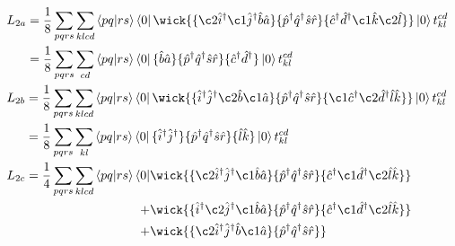 \begin{align}
    &\begin{aligned}
        L_{2a}
        &= \frac{1}{8}\sum_{pqrs} \sum_{klcd} \bra{pq} \ket{rs} \bra{0}
            \wick{
            \{\c2{\hat{i}}^\dagger \c1{\hat{j}}^\dagger \hat{b} \hat{a} \}
            \{\hat{p}^\dagger \hat{q}^\dagger \hat{s} \hat{r} \}
            \{\hat{c}^\dagger \hat{d}^\dagger \c1{\hat{k}} \c2{\hat{l}} \}
            }
            \ket{0}t^{cd}_{kl} \\
        &= \frac{1}{8}\sum_{pqrs} \sum_{cd} \bra{pq} \ket{rs} \bra{0}
            \{ \hat{b} \hat{a} \}
            \{\hat{p}^\dagger \hat{q}^\dagger \hat{s} \hat{r} \}
            \{ \hat{c}^\dagger \hat{d}^\dagger \}
            \ket{0}t^{cd}_{kl}
    \end{aligned} \\
    &\begin{aligned}
        L_{2b}
        &= \frac{1}{8}\sum_{pqrs} \sum_{klcd} \bra{pq} \ket{rs} \bra{0}
            \wick{
            \{\hat{i}^\dagger \hat{j}^\dagger \c2{\hat{b}} \c1{\hat{a}} \}
            \{\hat{p}^\dagger \hat{q}^\dagger \hat{s} \hat{r} \}
            \{\c1{\hat{c}}^\dagger \c2{\hat{d}}^\dagger \hat{l} \hat{k} \}
            }
            \ket{0}t^{cd}_{kl} \\
        &= \frac{1}{8}\sum_{pqrs} \sum_{kl} \bra{pq} \ket{rs} \bra{0}
            \{\hat{i}^\dagger \hat{j}^\dagger \}
            \{\hat{p}^\dagger \hat{q}^\dagger \hat{s} \hat{r} \}
            \{\hat{l} \hat{k} \}
            \ket{0}t^{cd}_{kl}
    \end{aligned} \\
    &\begin{aligned}
        L_{2c}
            = \frac{1}{4}\sum_{pqrs} \sum_{klcd} \bra{pq} \ket{rs} \bra{0}
            &\wick{
            \{\c2{\hat{i}}^\dagger \hat{j}^\dagger \c1{\hat{b}} \hat{a} \}
            \{\hat{p}^\dagger \hat{q}^\dagger \hat{s} \hat{r} \}
            \{\hat{c}^\dagger \c1{\hat{d}^\dagger} \c2{\hat{l}} \hat{k} \}
            } \\
            +
            &\wick{
            \{\hat{i}^\dagger \c2{\hat{j}}^\dagger \c1{\hat{b}} \hat{a} \}
            \{\hat{p}^\dagger \hat{q}^\dagger \hat{s} \hat{r} \}
            \{\hat{c}^\dagger \c1{\hat{d}^\dagger} \c2{\hat{l}} \hat{k} \}
            } \\
            +
            &\wick{
            \{\c2{\hat{i}}^\dagger \hat{j}^\dagger \hat{b} \c1{\hat{a}} \}
            \{\hat{p}^\dagger \hat{q}^\dagger \hat{s} \hat{r} \}
}
\end{aligned}
\end{align}
